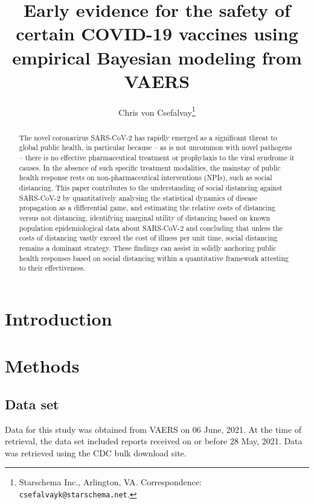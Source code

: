 \documentclass[12pt]{article}
\title{Early evidence for the safety of certain COVID-19 vaccines using  empirical Bayesian modeling from VAERS}
\author{Chris von Csefalvay\thanks{Starschema Inc., Arlington, VA. Correspondence: \texttt{csefalvayk@starschema.net}.}}
\begin{document}
\maketitle

\begin{abstract}
    The novel coronavirus SARS-CoV-2 has rapidly emerged as a significant threat to global public health, in particular because -- as is not uncommon with novel pathogens -- there is no effective pharmaceutical treatment or prophylaxis to the viral syndrome it causes. In the absence of such specific treatment modalities, the mainstay of public health response rests on non-pharmaceutical interventions (NPIs), such as social distancing. This paper contributes to the understanding of social distancing against SARS-CoV-2 by quantitatively analysing the statistical dynamics of disease propagation as a differential game, and estimating the relative costs of distancing versus not distancing, identifying marginal utility of distancing based on known population epidemiological data about SARS-CoV-2 and concluding that unless the costs of distancing vastly exceed the cost of illness per unit time, social distancing remains a dominant strategy. These findings can assist in solidly anchoring public health responses based on social distancing within a quantitative framework attesting to their effectiveness.
\end{abstract}

\section{Introduction} %
\label{sec:introduction}


\section{Methods} %
\label{sec:methods}

\subsection{Data set} %
\label{sub:data_set}

Data for this study was obtained from VAERS on 06 June, 2021. At the time of retrieval, the data set included reports received on or before 28 May, 2021. Data was retrieved using the CDC bulk download site.

\end{document}
